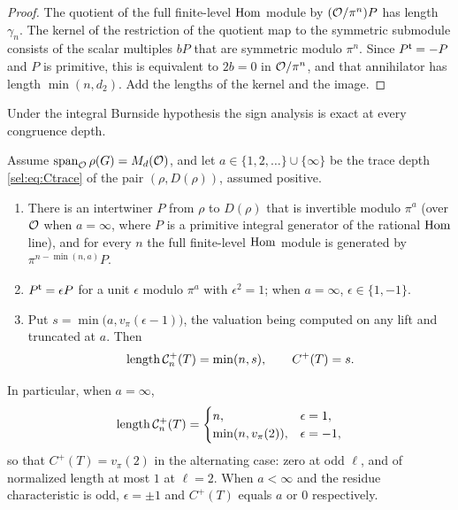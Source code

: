 \begin{proof}
The quotient of the full finite-level $\operatorname{Hom}$ module by $(\mathcal{O}/\pi^n)P$ has
length $\gamma_n$. The kernel of the restriction of the quotient map to the
symmetric submodule consists of the scalar multiples $bP$ that are symmetric
modulo $\pi^n$. Since $P^{\mathsf{t}}=-P$ and $P$ is primitive, this is
equivalent to $2b=0$ in $\mathcal{O}/\pi^n$, and that annihilator has length
$\min(n,d_2)$. Add the lengths of the kernel and the image.
\end{proof}

Under the integral Burnside hypothesis the sign analysis is exact at every
congruence depth.

\begin{proposition}\label{sel:prop:exactsign}
Assume $\operatorname{span}_{\mathcal{O}}\rho(G)=M_d(\mathcal{O})$, and let
$a\in\{1,2,\dots\}\cup\{\infty\}$ be the trace depth \eqref{sel:eq:Ctrace}
of the pair $(\rho,D(\rho))$, assumed positive.
\begin{enumerate}[label=\textup{(\roman*)}]
\item There is an intertwiner $P$ from $\rho$ to $D(\rho)$ that is invertible
modulo $\pi^a$ (over $\mathcal{O}$ when $a=\infty$, where $P$ is a primitive
integral generator of the rational $\operatorname{Hom}$ line), and for every $n$ the full
finite-level $\operatorname{Hom}$ module is generated by $\pi^{n-\min(n,a)}P$.
\item $P^{\mathsf{t}}=\epsilon P$ for a unit $\epsilon$ modulo $\pi^a$ with
$\epsilon^2=1$; when $a=\infty$, $\epsilon\in\{1,-1\}$.
\item Put $s=\min\bigl(a,v_\pi(\epsilon-1)\bigr)$, the valuation being
computed on any lift and truncated at $a$. Then
\[
 \operatorname{length}\mathcal C_n^+(T)=\min(n,s),\qquad C^+(T)=s .
\]
\end{enumerate}
In particular, when $a=\infty$,
\[
 \operatorname{length}\mathcal C_n^+(T)=
 \begin{cases}n,&\epsilon=1,\\ \min(n,v_\pi(2)),&\epsilon=-1,\end{cases}
\]
so that $C^+(T)=v_\pi(2)$ in the alternating case: zero at odd $\ell$, and of
normalized length at most $1$ at $\ell=2$. When $a<\infty$ and the residue
characteristic is odd, $\epsilon=\pm1$ and $C^+(T)$ equals $a$ or $0$
respectively.
\end{proposition}

